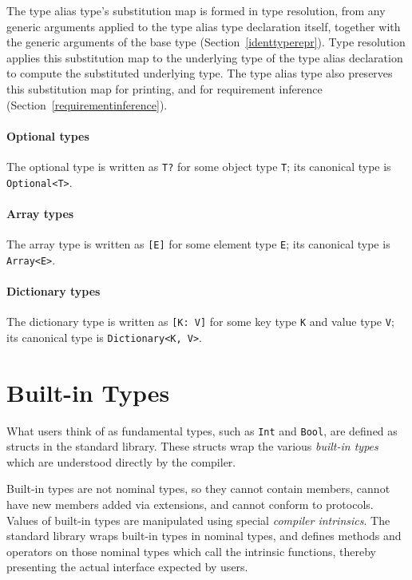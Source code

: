 \documentclass[a4paper,headsepline,bibliography=totoc,toc=flat,fleqn,twoside=semi]{scrbook}
\theoremstyle{definition}
\theoremstyle{definition}
\theoremstyle{definition}
\begin{document}
The type alias type's substitution map is formed in type resolution, from any generic arguments applied to the type alias type declaration itself, together with the generic arguments of the base type (Section~\ref{identtyperepr}). Type resolution applies this substitution map to the underlying type of the type alias declaration to compute the substituted underlying type. The type alias type also preserves this substitution map for printing, and for requirement inference (Section~\ref{requirementinference}).

\paragraph{Optional types} The optional type is written as \texttt{T?} for some object type \texttt{T}; its canonical type is \texttt{Optional<T>}.

\paragraph{Array types} The array type is written as \texttt{[E]} for some element type \texttt{E}; its canonical type is \texttt{Array<E>}.

\paragraph{Dictionary types} The dictionary type is written as \texttt{[K: V]} for some key type \texttt{K} and value type \texttt{V}; its canonical type is \texttt{Dictionary<K, V>}.

\section{Built-in Types}\label{builtin type}

What users think of as fundamental types, such as \texttt{Int} and \texttt{Bool}, are defined as structs in the standard library. These structs wrap the various \emph{built-in types} which are understood directly by the compiler.

Built-in types are not nominal types, so they cannot contain members, cannot have new members added via extensions, and cannot conform to protocols. Values of built-in types are manipulated using special \emph{compiler intrinsics}. The standard library wraps built-in types in nominal types, and defines methods and operators on those nominal types which call the intrinsic functions, thereby presenting the actual interface expected by users.
\end{document}
